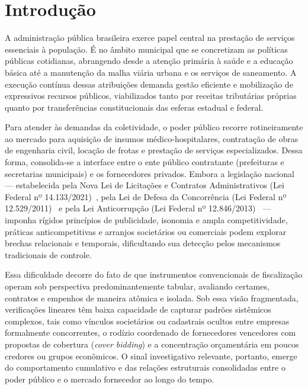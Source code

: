 \section{Introdução}
\label{sec:introducao}

A administração pública brasileira exerce papel central na prestação de serviços essenciais à população. É no âmbito municipal que se concretizam as políticas públicas cotidianas, abrangendo desde a atenção primária à saúde e a educação básica até a manutenção da malha viária urbana e os serviços de saneamento. A execução contínua dessas atribuições demanda gestão eficiente e mobilização de expressivos recursos públicos, viabilizados tanto por receitas tributárias próprias quanto por transferências constitucionais das esferas estadual e federal.

Para atender às demandas da coletividade, o poder público recorre rotineiramente ao mercado para aquisição de insumos médico-hospitalares, contratação de obras de engenharia civil, locação de frotas e prestação de serviços especializados. Dessa forma, consolida-se a interface entre o ente público contratante (prefeituras e secretarias municipais) e os fornecedores privados. Embora a legislação nacional — estabelecida pela Nova Lei de Licitações e Contratos Administrativos (Lei Federal nº 14.133/2021)~\cite{brasil2021licitacoes}, pela Lei de Defesa da Concorrência (Lei Federal nº 12.529/2011)~\cite{brasil2011concorrencia} e pela Lei Anticorrupção (Lei Federal nº 12.846/2013)~\cite{brasil2013anticorrupcao} — imponha rígidos princípios de publicidade, isonomia e ampla competitividade, práticas anticompetitivas e arranjos societários ou comerciais podem explorar brechas relacionais e temporais, dificultando sua detecção pelos mecanismos tradicionais de controle.

Essa dificuldade decorre do fato de que instrumentos convencionais de fiscalização operam sob perspectiva predominantemente tabular, avaliando certames, contratos e empenhos de maneira atômica e isolada. Sob essa visão fragmentada, verificações lineares têm baixa capacidade de capturar padrões sistêmicos complexos, tais como vínculos societários ou cadastrais ocultos entre empresas formalmente concorrentes, o rodízio coordenado de fornecedores vencedores com propostas de cobertura (\textit{cover bidding}) e a concentração orçamentária em poucos credores ou grupos econômicos. O sinal investigativo relevante, portanto, emerge do comportamento cumulativo e das relações estruturais consolidadas entre o poder público e o mercado fornecedor ao longo do tempo.

